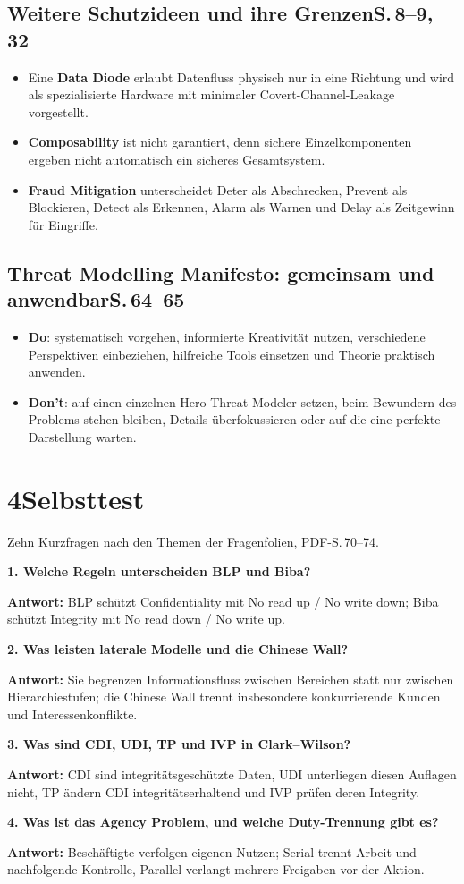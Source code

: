 \documentclass[11pt,a4paper]{article}
\newcommand{\block}[2]{\subsection*{#1\hfill{\normalfont\small #2}}}
\newcommand{\qa}[3]{\par\vspace{4pt}\textbf{#1. #2}\par #3\par}
\begin{document}
\block{Weitere Schutzideen und ihre Grenzen}{S.\,8--9, 32}
\begin{itemize}
\item Eine \textbf{Data Diode} erlaubt Datenfluss physisch nur in eine Richtung und wird als spezialisierte Hardware mit minimaler Covert-Channel-Leakage vorgestellt.
\item \textbf{Composability} ist nicht garantiert, denn sichere Einzelkomponenten ergeben nicht automatisch ein sicheres Gesamtsystem.
\item \textbf{Fraud Mitigation} unterscheidet Deter als Abschrecken, Prevent als Blockieren, Detect als Erkennen, Alarm als Warnen und Delay als Zeitgewinn für Eingriffe.
\end{itemize}

\block{Threat Modelling Manifesto: gemeinsam und anwendbar}{S.\,64--65}
\begin{itemize}
\item \textbf{Do}: systematisch vorgehen, informierte Kreativität nutzen, verschiedene Perspektiven einbeziehen, hilfreiche Tools einsetzen und Theorie praktisch anwenden.
\item \textbf{Don't}: auf einen einzelnen Hero Threat Modeler setzen, beim Bewundern des Problems stehen bleiben, Details überfokussieren oder auf die eine perfekte Darstellung warten.
\end{itemize}

\newpage
\section*{4\quad Selbsttest}
{\small Zehn Kurzfragen nach den Themen der Fragenfolien, PDF-S.\,70--74.}

\qa{1}{Welche Regeln unterscheiden BLP und Biba?}
{\textbf{Antwort:} BLP schützt Confidentiality mit No read up / No write down; Biba schützt Integrity mit No read down / No write up.}

\qa{2}{Was leisten laterale Modelle und die Chinese Wall?}
{\textbf{Antwort:} Sie begrenzen Informationsfluss zwischen Bereichen statt nur zwischen Hierarchiestufen; die Chinese Wall trennt insbesondere konkurrierende Kunden und Interessenkonflikte.}

\qa{3}{Was sind CDI, UDI, TP und IVP in Clark--Wilson?}
{\textbf{Antwort:} CDI sind integritätsgeschützte Daten, UDI unterliegen diesen Auflagen nicht, TP ändern CDI integritätserhaltend und IVP prüfen deren Integrity.}

\qa{4}{Was ist das Agency Problem, und welche Duty-Trennung gibt es?}
{\textbf{Antwort:} Beschäftigte verfolgen eigenen Nutzen; Serial trennt Arbeit und nachfolgende Kontrolle, Parallel verlangt mehrere Freigaben vor der Aktion.}
\end{document}
